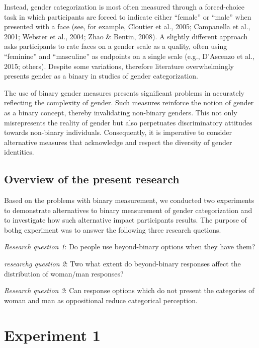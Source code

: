 \documentclass[
  man]{apa7}
\begin{document}
Instead, gender categorization is most often measured through a forced-choice task in which participants are forced to indicate either ``female'' or ``male'' when presented with a face (see, for example, Cloutier et al., 2005; Campanella et al., 2001; Webster et al., 2004; Zhao \& Bentin, 2008). A slightly different approach asks participants to rate faces on a gender scale as a quality, often using ``feminine'' and ``masculine'' as endpoints on a single scale (e.g., D'Ascenzo et al., 2015; others). Despite some variations, therefore literature overwhelmingly presents gender as a binary in studies of gender categorization.

The use of binary gender measures presents significant problems in accurately reflecting the complexity of gender. Such measures reinforce the notion of gender as a binary concept, thereby invalidating non-binary genders. This not only misrepresents the reality of gender but also perpetuates discriminatory attitudes towards non-binary individuals. Consequently, it is imperative to consider alternative measures that acknowledge and respect the diversity of gender identities.

\hypertarget{overview-of-the-present-research}{%
\subsection{Overview of the present research}\label{overview-of-the-present-research}}

Based on the problems with binary measurement, we conducted two experiments to demonstrate alternatives to binary measurement of gender categorization and to investigate how such alternative impact participants results. The purpose of bothg experiment was to answer the following three research quetions.

\emph{Research question 1}: Do people use beyond-binary options when they have them?

\emph{researchg question 2}: Two what extent do beyond-binary responses affect the distribution of woman/man responses?

\emph{Research question 3}: Can response options which do not present the categories of woman and man as oppositional reduce categorical perception.

\hypertarget{experiment-1}{%
\section{Experiment 1}\label{experiment-1}}
\end{document}
